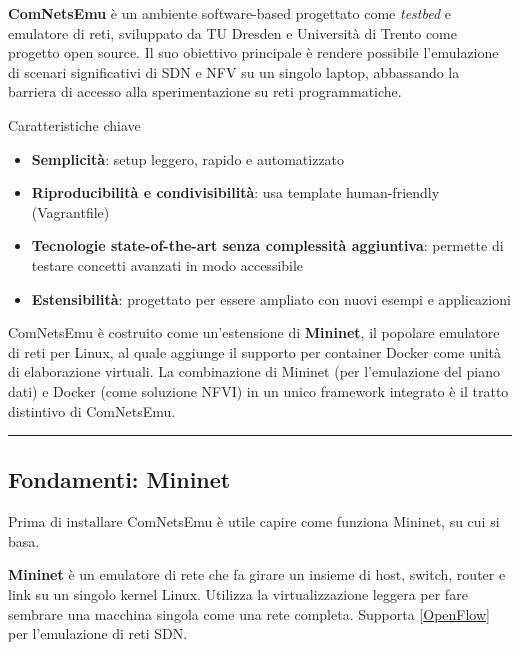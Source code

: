 \documentclass[
  italian,
  openany]{book}
\providecommand{\tightlist}{%
  \setlength{\itemsep}{0pt}\setlength{\parskip}{0pt}}
\begin{document}
\textbf{ComNetsEmu} è un ambiente software-based progettato come
\emph{testbed} e emulatore di reti, sviluppato da TU Dresden e
Università di Trento come progetto open source. Il suo obiettivo
principale è rendere possibile l'emulazione di scenari significativi di
SDN e NFV su un singolo laptop, abbassando la barriera di accesso alla
sperimentazione su reti programmatiche.

\begin{calloutnote}{Caratteristiche chiave}

\begin{itemize}
\tightlist
\item
  \textbf{Semplicità}: setup leggero, rapido e automatizzato
\item
  \textbf{Riproducibilità e condivisibilità}: usa template
  human-friendly (Vagrantfile)
\item
  \textbf{Tecnologie state-of-the-art senza complessità aggiuntiva}:
  permette di testare concetti avanzati in modo accessibile
\item
  \textbf{Estensibilità}: progettato per essere ampliato con nuovi
  esempi e applicazioni
\end{itemize}

\end{calloutnote}

ComNetsEmu è costruito come un'estensione di \textbf{Mininet}, il
popolare emulatore di reti per Linux, al quale aggiunge il supporto per
container Docker come unità di elaborazione virtuali. La combinazione di
Mininet (per l'emulazione del piano dati) e Docker (come soluzione NFVI)
in un unico framework integrato è il tratto distintivo di ComNetsEmu.

\begin{center}\rule{0.5\linewidth}{0.5pt}\end{center}

\subsection{Fondamenti: Mininet}\label{fondamenti-mininet}

Prima di installare ComNetsEmu è utile capire come funziona Mininet, su
cui si basa.

\textbf{Mininet} è un emulatore di rete che fa girare un insieme di
host, switch, router e link su un singolo kernel Linux. Utilizza la
virtualizzazione leggera per fare sembrare una macchina singola come una
rete completa. Supporta {[}\hyperref[openflow]{OpenFlow}{]} per
l'emulazione di reti SDN.
\end{document}
